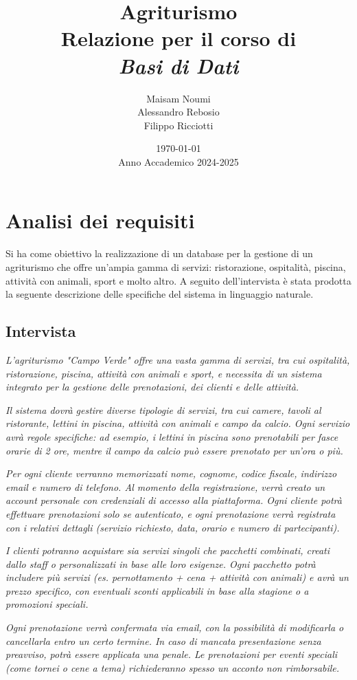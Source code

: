 \documentclass[a4paper,11pt]{report}
\title{
    \vspace*{2cm}
    \Huge\textbf{Agriturismo} \\[0.5cm]
    \LARGE Relazione per il corso di \\[0.2cm]
    \textit{Basi di Dati} \\[2cm]
}
\author{
    \Large
    Maisam Noumi \\
    Alessandro Rebosio \\
    Filippo Ricciotti
}
\date{
    \vspace{1cm}
    \today \\[0.5cm]
    Anno Accademico 2024-2025
}
\begin{document}
\maketitle

\tableofcontents

\chapter{Analisi dei requisiti}
Si ha come obiettivo la realizzazione di un database per la gestione di un agriturismo che offre un'ampia gamma di servizi: ristorazione,
ospitalità, piscina, attività con animali, sport e molto altro. A seguito dell'intervista è stata prodotta la seguente
descrizione delle specifiche del sistema in linguaggio naturale.

\section{Intervista}
\textit{L'agriturismo "Campo Verde" offre una vasta gamma di servizi, tra cui ospitalità, ristorazione, piscina, attività con animali
	e sport, e necessita di un sistema integrato per la gestione delle prenotazioni, dei clienti e delle attività.}

\textit{Il sistema dovrà gestire diverse tipologie di servizi, tra cui camere, tavoli al ristorante, lettini in piscina, attività
	con animali e campo da calcio. Ogni servizio avrà regole specifiche: ad esempio, i lettini in piscina sono prenotabili per fasce orarie
	di 2 ore, mentre il campo da calcio può essere prenotato per un'ora o più.}

\textit{Per ogni cliente verranno memorizzati nome, cognome, codice fiscale, indirizzo email e numero di telefono. Al momento della
	registrazione, verrà creato un account personale con credenziali di accesso alla piattaforma. Ogni cliente potrà effettuare prenotazioni
	solo se autenticato, e ogni prenotazione verrà registrata con i relativi dettagli (servizio richiesto, data, orario e numero di partecipanti).}

\textit{I clienti potranno acquistare sia servizi singoli che pacchetti combinati, creati dallo staff o personalizzati in base alle
	loro esigenze. Ogni pacchetto potrà includere più servizi (es. pernottamento + cena + attività con animali) e avrà un prezzo
	specifico, con eventuali sconti applicabili in base alla stagione o a promozioni speciali.}

\textit{Ogni prenotazione verrà confermata via email, con la possibilità di modificarla o cancellarla entro un certo termine. In
	caso di mancata presentazione senza preavviso, potrà essere applicata una penale. Le prenotazioni per eventi speciali (come tornei o cene a tema)
	richiederanno spesso un acconto non rimborsabile.}
\end{document}
